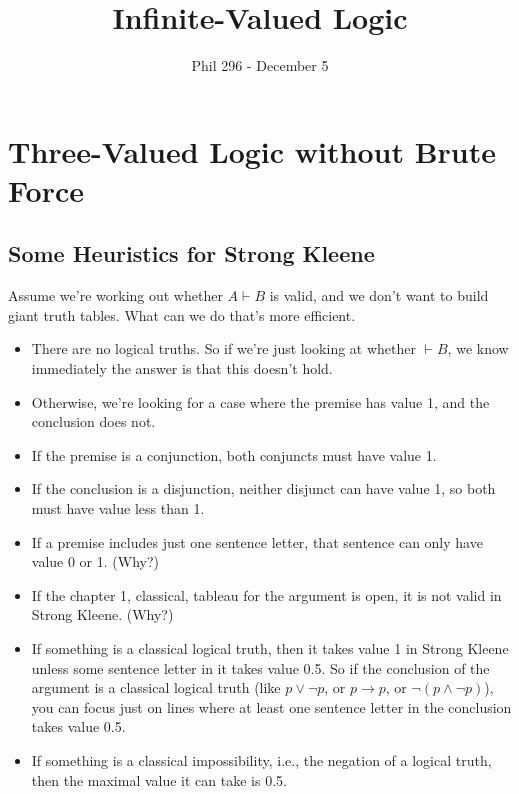 \documentclass[
]{article}
\title{Infinite-Valued Logic}
\author{Phil 296 - December 5}
\date{}
\providecommand{\tightlist}{%
  \setlength{\itemsep}{0pt}\setlength{\parskip}{0pt}}\usepackage{longtable,booktabs,array}
\begin{document}
\maketitle
\ifdefined\Shaded\renewenvironment{Shaded}{\begin{tcolorbox}[frame hidden, enhanced, interior hidden, boxrule=0pt, breakable, borderline west={3pt}{0pt}{shadecolor}, sharp corners]}{\end{tcolorbox}}\fi

\hypertarget{three-valued-logic-without-brute-force}{%
\section{Three-Valued Logic without Brute
Force}\label{three-valued-logic-without-brute-force}}

\hypertarget{some-heuristics-for-strong-kleene}{%
\subsection{Some Heuristics for Strong
Kleene}\label{some-heuristics-for-strong-kleene}}

Assume we're working out whether \(A \vdash B\) is valid, and we don't
want to build giant truth tables. What can we do that's more efficient.

\begin{itemize}
\tightlist
\item
  There are no logical truths. So if we're just looking at whether
  \(\vdash B\), we know immediately the answer is that this doesn't
  hold.
\item
  Otherwise, we're looking for a case where the premise has value 1, and
  the conclusion does not.
\item
  If the premise is a conjunction, both conjuncts must have value 1.
\item
  If the conclusion is a disjunction, neither disjunct can have value 1,
  so both must have value less than 1.
\item
  If a premise includes just one sentence letter, that sentence can only
  have value 0 or 1. (Why?)
\item
  If the chapter 1, classical, tableau for the argument is open, it is
  not valid in Strong Kleene. (Why?)
\item
  If something is a classical logical truth, then it takes value 1 in
  Strong Kleene unless some sentence letter in it takes value 0.5. So if
  the conclusion of the argument is a classical logical truth (like
  \(p \vee \neg p\), or \(p \rightarrow p\), or
  \(\neg(p \wedge \neg p)\)), you can focus just on lines where at least
  one sentence letter in the conclusion takes value 0.5.
\item
  If something is a classical impossibility, i.e., the negation of a
  logical truth, then the maximal value it can take is 0.5.
\end{itemize}
\end{document}
